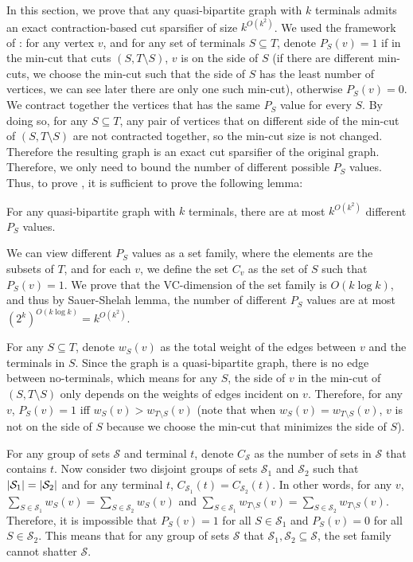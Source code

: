 \iffalse
In this section, we prove that any quasi-bipartite graph with $k$ terminals admits an exact contraction-based cut sparsifier of size $k^{O(k^2)}$. We used the framework of \cite{khan2014mimicking}: for any vertex $v$, and for any set of terminals $S \subseteq T$, denote $P_S(v)=1$ if in the min-cut that cuts $(S,T \setminus S)$, $v$ is on the side of $S$ (if there are different min-cuts, we choose the min-cut such that the side of $S$ has the least number of vertices, we can see later there are only one such min-cut), otherwise $P_S(v)=0$. We contract together the vertices that has the same $P_S$ value for every $S$. By doing so, for any $S \subseteq T$, any pair of vertices that on different side of the min-cut of $(S, T \setminus S)$ are not contracted together, so the min-cut size is not changed. Therefore the resulting graph is an exact cut sparsifier of the original graph. Therefore, we only need to bound the number of different possible $P_S$ values. Thus, to prove , it is sufficient to prove the following lemma:

\begin{lemma} \label{quasi_profile}
    For any quasi-bipartite graph with $k$ terminals, there are at most $k^{O(k^2)}$ different $P_S$ values.
\end{lemma}

We can view different $P_S$ values as a set family, where the elements are the subsets of $T$, and for each $v$, we define the set $C_v$ as the set of $S$ such that $P_S(v)=1$. We prove that the VC-dimension of the set family is $O(k \log k)$, and thus by Sauer-Shelah lemma, the number of different $P_S$ values are at most $(2^k)^{O(k \log k)} = k^{O(k^2)}$.  

For any $S \subseteq T$, denote $w_S(v)$ as the total weight of the edges between $v$ and the terminals in $S$. Since the graph is a quasi-bipartite graph, there is no edge between no-terminals, which means for any $S$, the side of $v$ in the min-cut of $(S,T \setminus S)$ only depends on the weights of edges incident on $v$. Therefore, for any $v$, $P_S(v)=1$ iff $w_S(v) > w_{T \setminus S}(v)$ (note that when $w_S(v) = w_{T \setminus S}(v)$, $v$ is not on the side of $S$ because we choose the min-cut that minimizes the side of $S$). 

For any group of sets $\mathcal{S}$ and terminal $t$, denote $C_{\mathcal{S}}$ as the number of sets in $\mathcal{S}$ that contains $t$. Now consider two disjoint groups of sets $\mathcal{S}_1$ and $\mathcal{S}_2$ such that $\left| \mathcal{S}_1 \right| = \left| \mathcal{S}_2 \right|$ and for any terminal $t$, $C_{\mathcal{S}_1}(t)=C_{\mathcal{S}_2}(t)$. In other words, for any $v$, $\sum_{S\in \mathcal{S}_1} w_{S}(v) = \sum_{S \in \mathcal{S}_2} w_{S}(v)$ and $\sum_{S \in \mathcal{S}_1} w_{T \setminus S}(v) = \sum_{S \in \mathcal{S}_2} w_{T \setminus S}(v)$. Therefore, it is impossible that $P_{S}(v)=1$ for all $S \in \mathcal{S}_1$ and $P_{S}(v)=0$ for all $S \in \mathcal{S}_2$. This means that for any group of sets $\mathcal{S}$ that $\mathcal{S}_1,\mathcal{S}_2 \subseteq \mathcal{S}$, the set family cannot shatter $\mathcal{S}$.


